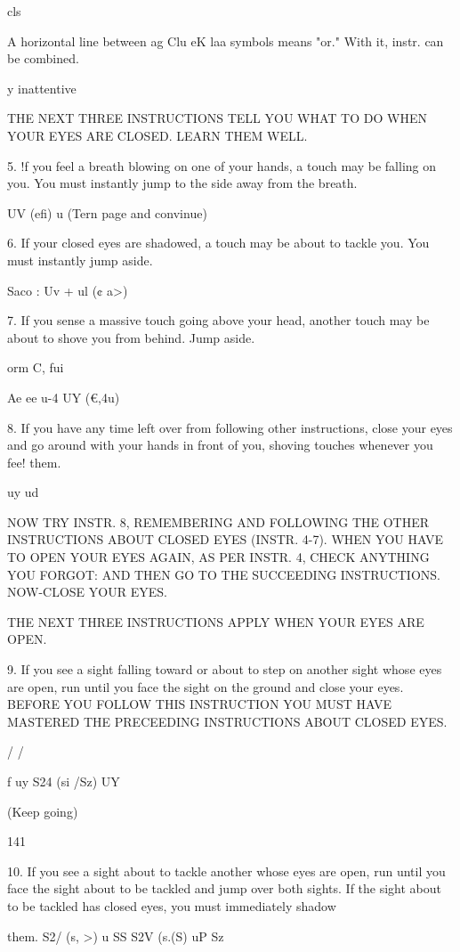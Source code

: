 \documentclass[10pt,twoside]{memoir}
\begin{document}
\begin{enumerate}
{\begin{enumerate}
\begin{sysrules}
\begin{sysrules}
\begin{sysrules}
\begin{sysrules}
{\begin{enumerate}
{{{{{{cls {A horizontal line between 
ag Clu eK laa symbols means "or." 
With it, instr. can be combined. 


y inattentive 


THE NEXT THREE INSTRUCTIONS TELL YOU WHAT TO DO 
WHEN YOUR EYES ARE CLOSED. LEARN THEM WELL. 


5. !f you feel a breath blowing on one of your hands, a touch may be 
falling on you. You must instantly jump to the side away from the breath. 


UV (efi) u (Tern page and convinue) 


6. If your closed eyes are shadowed, a touch may be about to tackle 
you. You must instantly jump aside. 


Saco : 
Uv + ul 
(¢ a>) 


7. If you sense a massive touch going above your head, another touch 
may be about to shove you from behind. Jump aside. 


orm 
C, fui 


Ae ee u-4 
UY (€,4u) 


8. If you have any time left over from following other instructions, 
close your eyes and go around with your hands in front of you, shoving 
touches whenever you fee! them. 


uy ud 


NOW TRY INSTR. 8, REMEMBERING AND FOLLOWING THE 
OTHER INSTRUCTIONS ABOUT CLOSED EYES (INSTR. 4-7). WHEN 
YOU HAVE TO OPEN YOUR EYES AGAIN, AS PER INSTR. 4, CHECK 
ANYTHING YOU FORGOT: AND THEN GO TO THE SUCCEEDING 
INSTRUCTIONS. NOW-CLOSE YOUR EYES. 

THE NEXT THREE INSTRUCTIONS APPLY WHEN YOUR EYES 
ARE OPEN. 


9. If you see a sight falling toward or about to step on another sight 
whose eyes are open, run until you face the sight on the ground and close 
your eyes. BEFORE YOU FOLLOW THIS INSTRUCTION YOU MUST 
HAVE MASTERED THE PRECEEDING INSTRUCTIONS ABOUT 
CLOSED EYES. 


/ 
/ 


f 
uy S24 (si /Sz) UY 


(Keep going) 


141 


10. If you see a sight about to tackle another whose eyes are open, run 
until you face the sight about to be tackled and jump over both sights. If the 
sight about to be tackled has closed eyes, you must immediately shadow 


them. 
S2/ (s, \e>) u SS 
S2V (s.(S) uP Sz 


}}}}}}}
\end{enumerate}}
\end{sysrules}
\end{sysrules}
\end{sysrules}
\end{sysrules}
\end{enumerate}}
\end{enumerate}
\end{document}

